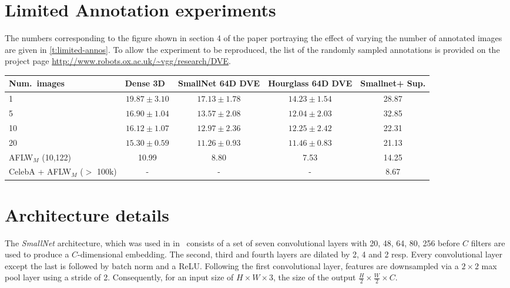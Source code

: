\documentclass[10pt,twocolumn,letterpaper]{article}
\begin{document}
\section{Limited Annotation experiments}

The numbers corresponding to the figure shown in section 4 of the paper portraying the effect of varying the number of annotated images are given in \cref{t:limited-annos}.  To allow the experiment to be reproduced, the list of the randomly sampled annotations is provided on the project page \url{http://www.robots.ox.ac.uk/~vgg/research/DVE}.

\begin{table*}[t]
\centering
\setlength\tabcolsep{0.5em}
\begin{tabular}{lcccc}
\toprule
Num.\ images & Dense 3D~\cite{thewlis17Bunsupervised}  &  SmallNet 64D DVE & Hourglass 64D DVE & Smallnet+ Sup. \\
\midrule
1                   & $19.87 \pm 3.10$ & $17.13 \pm 1.78$ & $14.23 \pm 1.54$ & 28.87 \\
5                   & $16.90 \pm 1.04$ & $13.57 \pm 2.08$ & $12.04 \pm 2.03$ & 32.85 \\
10                  & $16.12 \pm 1.07$ & $12.97 \pm 2.36$ & $12.25 \pm 2.42$ & 22.31\\
20                  & $15.30 \pm 0.59$ & $11.26 \pm 0.93$ & $11.46 \pm 0.83$ & 21.13 \\
AFLW$_M$ (10,122)   & 10.99          & 8.80           & 7.53           & 14.25\\
CelebA + AFLW$_M$ ($>$ 100k) & -     & -              & -               & 8.67 \\
\bottomrule
\end{tabular}
\medskip
\caption{Error (\% inter-ocular distance) Varying the number of images used for training (AFLW$_M$). The errors are reported in the form (mean $\pm$ std.), where the statistics are computed three randomly seeded samples of annotations. The general indication is that most of the information has been encoded in the unsupervised stage. }\label{t:limited-annos}
\end{table*}



\section{Architecture details}

The \textit{SmallNet} architecture, which was used in in~\cite{thewlis17unsupervised,thewlis17Bunsupervised} consists of a set of seven convolutional layers with 20, 48, 64, 80, 256 before $C$ filters are used to produce a $C$-dimensional embedding. The second, third and fourth layers are dilated by 2, 4 and 2 resp.  Every convolutional layer except the last is followed by batch norm and a {ReLU}. Following the first convolutional layer, features are downsampled via a $2\times 2$ max pool layer using a stride of 2.  Consequently, for an input size of $H\times W\times 3$, the size of the output $\frac{H}{2}\times \frac{W}{2}\times C$.
\end{document}
